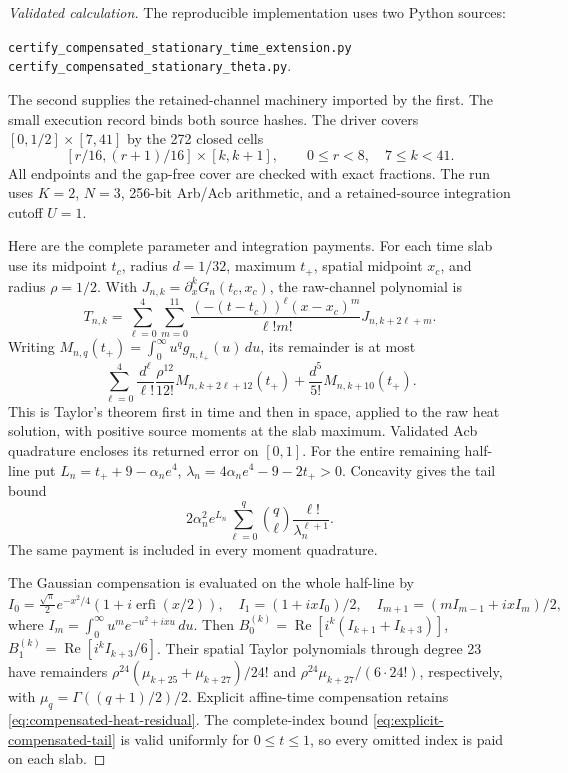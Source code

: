 \documentclass[11pt]{article}
\numberwithin{equation}{section}
\theoremstyle{definition}
\theoremstyle{remark}
\begin{document}
\begin{proof}[Validated calculation]
The reproducible implementation uses two Python sources:
\begin{center}
\small
\nolinkurl{certify_compensated_stationary_time_extension.py}\\
\nolinkurl{certify_compensated_stationary_theta.py}.
\end{center}
The second supplies the retained-channel machinery imported by the first.
The small execution record binds both source hashes.
The driver covers \([0,1/2]\times[7,41]\)
by the 272 closed cells
\[
 [r/16,(r+1)/16]\times[k,k+1],\qquad
 0\le r<8,\quad 7\le k<41.
\]
All endpoints and the gap-free cover are checked with exact fractions.
The run uses \(K=2\), \(N=3\), 256-bit Arb/Acb arithmetic, and a
retained-source integration cutoff \(U=1\).

Here are the complete parameter and integration payments. For each time
slab use its midpoint \(t_c\), radius \(d=1/32\), maximum \(t_+\),
spatial midpoint \(x_c\), and radius \(\rho=1/2\).
With \(J_{n,k}=\partial_x^kG_n(t_c,x_c)\), the raw-channel polynomial is
\[
 T_{n,k}=\sum_{\ell=0}^4\sum_{m=0}^{11}
 \frac{(-(t-t_c))^\ell(x-x_c)^m}{\ell!m!}J_{n,k+2\ell+m}.
\]
Writing \(M_{n,q}(t_+)=\int_0^\infty u^qg_{n,t_+}(u)\,du\),
its remainder is at most
\[
 \sum_{\ell=0}^4\frac{d^\ell}{\ell!}
 \frac{\rho^{12}}{12!}M_{n,k+2\ell+12}(t_+)
 +\frac{d^5}{5!}M_{n,k+10}(t_+).
\]
This is Taylor's theorem first in time and then in space, applied to
the raw heat solution, with positive source moments at the slab maximum.
Validated Acb quadrature encloses its returned error on \([0,1]\).
For the entire remaining half-line put
\(L_n=t_++9-\alpha_ne^4\),
\(\lambda_n=4\alpha_ne^4-9-2t_+>0\). Concavity gives the tail bound
\[
 2\alpha_n^2e^{L_n}
 \sum_{\ell=0}^q\binom q\ell\frac{\ell!}{\lambda_n^{\ell+1}}.
\]
The same payment is included in every moment quadrature.

The Gaussian compensation is evaluated on the whole half-line by
\[
 I_0=\tfrac{\sqrt\pi}{2}e^{-x^2/4}(1+i\operatorname{erfi}(x/2)),
 \quad I_1=(1+ixI_0)/2,\quad
 I_{m+1}=(mI_{m-1}+ixI_m)/2,
\]
where \(I_m=\int_0^\infty u^me^{-u^2+ixu}\,du\).
Then \(B_0^{(k)}=\operatorname{Re}[i^k(I_{k+1}+I_{k+3})]\),
\(B_1^{(k)}=\operatorname{Re}[i^kI_{k+3}/6]\).
Their spatial Taylor polynomials through degree 23 have remainders
\(\rho^{24}(\mu_{k+25}+\mu_{k+27})/24!\) and
\(\rho^{24}\mu_{k+27}/(6\cdot24!)\), respectively, with
\(\mu_q=\Gamma((q+1)/2)/2\).
Explicit affine-time compensation retains
\eqref{eq:compensated-heat-residual}. The complete-index bound
\eqref{eq:explicit-compensated-tail} is valid uniformly for \(0\le t\le1\),
so every omitted index is paid on each slab.


\end{proof}
\end{document}
